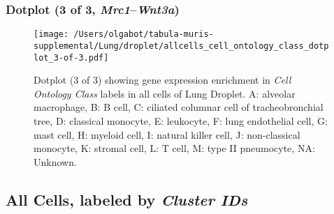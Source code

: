 \clearpage

\subsubsection{Dotplot (3 of 3, \emph{Mrc1}--\emph{Wnt3a})}
\begin{figure}[h]
\centering
\texttt{[image: /Users/olgabot/tabula-muris-supplemental/Lung/droplet/allcells\_cell\_ontology\_class\_dotplot\_3-of-3.pdf]}

\caption{ Dotplot (3 of 3)  showing gene expression enrichment in \emph{Cell Ontology Class} labels in all cells of Lung Droplet. A: alveolar macrophage, B: B cell, C: ciliated columnar cell of tracheobronchial tree, D: classical monocyte, E: leukocyte, F: lung endothelial cell, G: mast cell, H: myeloid cell, I: natural killer cell, J: non-classical monocyte, K: stromal cell, L: T cell, M: type II pneumocyte, NA: Unknown.}
\end{figure}


\clearpage

\subsection{All Cells, labeled by \emph{Cluster IDs}}
